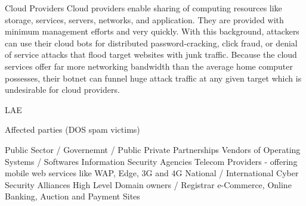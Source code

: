 \label{cap:sec4}


Cloud Providers 
Cloud  providers enable sharing of computing resources like storage, services, servers, networks, and application. They are provided with minimum management efforts and very quickly. With this background, attackers can use their cloud bots for distributed password-cracking, click fraud, or denial of service attacks that flood target websites with junk traffic. Because the cloud services offer far more networking bandwidth than the average home computer possesses, their botnet can funnel huge attack traffic at any given target which is undesirable for cloud providers.

LAE


Affected parties (DOS spam victims)

Public Sector / Governemnt / Public Private Partnerships
Vendors of Operating Systems / Softwares
Information Security Agencies
Telecom Providers - offering mobile web services like WAP, Edge, 3G and 4G
National / International Cyber Security Alliances
High Level Domain owners / Registrar 
e-Commerce, Online Banking, Auction and Payment Sites 
